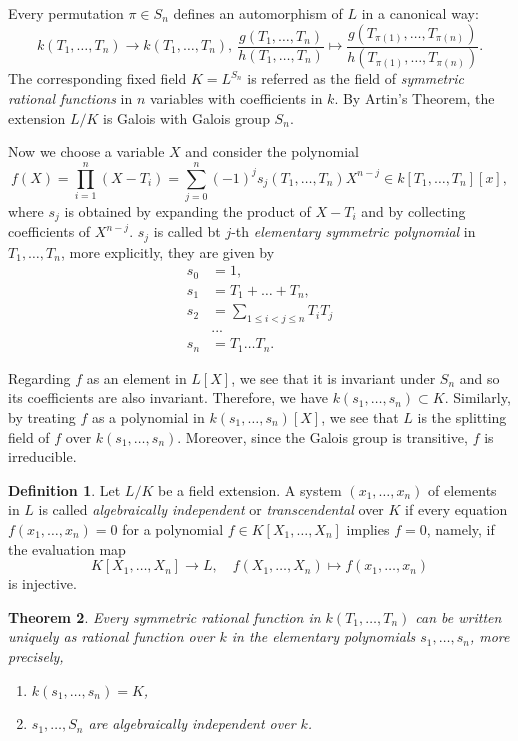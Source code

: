 \documentclass[12pt]{report}
\newtheorem{theorem}{Theorem}[section]
\theoremstyle{definition}
\newtheorem{definition}[theorem]{Definition}
\begin{document}
Every permutation $\pi\in S_n$ defines an automorphism of $L$ in a canonical way: $$k(T_1,\dots,T_n)\to k(T_1,\dots,T_n),~\frac{g(T_1,\dots,T_n)}{h(T_1,\dots,T_n)}\mapsto \frac{g(T_{\pi(1)},\dots,T_{\pi(n)})}{h(T_{\pi(1)},\dots,T_{\pi(n)})}.$$
The corresponding fixed field $K=L^{S_n}$ is referred as the field of \emph{symmetric rational functions} in $n$ variables with coefficients in $k$. By Artin's Theorem, the extension $L/K$ is Galois with Galois group $S_n$.

Now we choose a variable $X$ and consider the polynomial
$$f(X)=\prod_{i=1}^n(X-T_i)=\sum_{j=0}^n (-1)^js_j(T_1,\dots,T_n)X^{n-j}\in k[T_1,\dots,T_n][x],$$
where $s_j$ is obtained by expanding the product of $X-T_i$ and by collecting coefficients of $X^{n-j}$. $s_j$ is called bt $j$-th \emph{elementary symmetric polynomial} in $T_1,\dots,T_n$, more explicitly, they are given by 
\begin{align*}
	s_0&=1,\\
	s_1&=T_1+\dots+T_n,\\
	s_2&= \sum_{1\leq i<j\leq n} T_iT_j\\
	& ...\\
	s_n&=T_1\dots T_n.
\end{align*}

Regarding $f$ as an element in $L[X]$, we see that it is invariant under $S_n$ and so its coefficients are also invariant. Therefore, we have $k(s_1,\dots,s_n)\subset K$. Similarly, by treating $f$ as a polynomial in $k(s_1,\dots,s_n)[X]$, we see that $L$ is the splitting field of $f$ over $k(s_1,\dots,s_n)$. Moreover, since the Galois group is transitive, $f$ is irreducible.

\begin{definition}
	Let $L/K$ be a field extension. A system $(x_1,\dots, x_n)$ of elements in $L$ is called \emph{algebraically independent} or \emph{transcendental} over $K$ if every equation $f(x_1,\dots, x_n) = 0$ for a polynomial $f \in K[X_1,\dots, X_n]$ implies $f = 0$, namely, if the evaluation map  
	$$K[X_1,\dots, X_n]\to L,\quad f(X_1,\dots,X_n)\mapsto f(x_1,\dots, x_n)$$
	is injective.
\end{definition}

\begin{theorem}
	Every symmetric rational function in $k(T_1,\dots,T_n)$ can be written uniquely as rational function over $k$ in the elementary polynomials $s_1,\dots,s_n$, more precisely,
	\begin{enumerate}
		\item $k(s_1,\dots,s_n)=K$,
		\item $s_1,\dots,S_n$ are algebraically independent over $k$.
	\end{enumerate}
\end{theorem}
\end{document}
